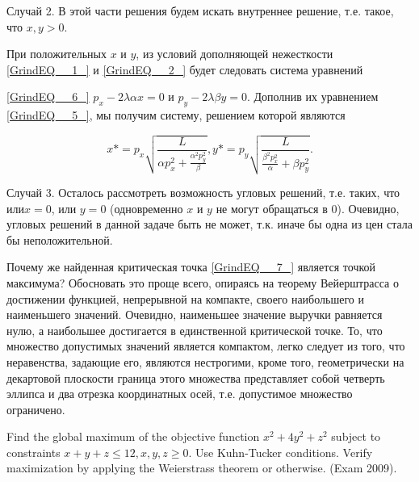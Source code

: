 \begin{solution}
Случай 2. В этой части решения будем искать внутреннее решение, т.е. такое, что $x,y>0$.

При положительных $x$ и $y$, из условий дополняющей нежесткости \eqref{GrindEQ__1_} и \eqref{GrindEQ__2_} будет следовать система уравнений

\eqref{GrindEQ__6_}  $p_{x} -2\lambda \alpha x=0$ и $p_{y} -2\lambda \beta y=0$. Дополнив их уравнением \eqref{GrindEQ__5_}, мы получим систему, решением которой являются 

\begin{equation} \label{GrindEQ__7_} x*=p_{x} \sqrt{\frac{L}{\alpha p_{x}^{2} +\frac{\alpha ^{2} p_{y}^{2} }{\beta } } } , y*=p_{y} \sqrt{\frac{L}{\frac{\beta ^{2} p_{x}^{2} }{\alpha } +\beta p_{y}^{2} } } . \end{equation} 

Случай 3. Осталось рассмотреть возможность угловых решений, т.е. таких, что или$x=0$, или $y=0$ (одновременно $x$ и $y$ не могут обращаться в 0). Очевидно, угловых решений в данной задаче быть не может, т.к. иначе бы одна из цен стала бы неположительной.

Почему же найденная критическая точка \eqref{GrindEQ__7_} является точкой максимума? Обосновать это проще всего, опираясь на теорему Вейерштрасса о достижении функцией, непрерывной на компакте, своего наибольшего и наименьшего значений. Очевидно, наименьшее значение выручки равняется нулю, а наибольшее достигается в единственной критической точке. То, что множество допустимых значений является компактом, легко следует из того, что неравенства, задающие его, являются нестрогими, кроме того, геометрически на декартовой плоскости граница этого множества представляет собой четверть эллипса и два отрезка координатных осей, т.е. допустимое множество ограничено.
\end{solution}


\begin{problem}
Find the global maximum of the objective function $x^{2} +4y^{2} +z^{2} $ subject to constraints $x+y+z\le 12, x,y,z\ge 0$. Use Kuhn-Tucker conditions. Verify maximization by applying the Weierstrass theorem or otherwise. (Exam 2009).
\end{problem}

